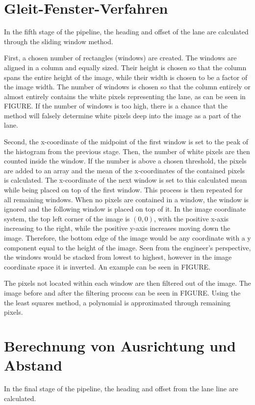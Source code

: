 \documentclass[arbeit=studie,oneside,BCOR=12mm]{ArbeitRST}
\begin{document}
\section{Gleit-Fenster-Verfahren}
In the fifth stage of the pipeline, the heading and offset of the lane are
calculated through the sliding window method.

First, a chosen number of rectangles (windows) are created. The windows are
aligned in a column and equally sized. Their height is chosen so that the
column spans the entire height of the image, while their width is chosen to be
a factor of the image width. The number of windows is chosen so that the column
entirely or almost entirely  contains the white pixels representing the lane,
as can be seen in FIGURE. If the number of windows is too high, there is a
chance that the method will falsely determine white pixels deep into the image
as a part of the lane. 

Second, the x-coordinate of the midpoint of the first window is set to the peak
of the histogram from the previous stage. Then, the number of white pixels are
then counted inside the window. If the number is above a chosen threshold, the
pixels are added to an array and the mean of the x-coordinates of the contained
pixels is calculated. The x-coordinate of the next window is set to this
calculated mean while being placed on top of the first window. This process is
then repeated for all remaining windows. When no pixels are contained in a
window, the window is ignored and the following window is placed on top of it.
In the image coordinate system, the top left corner of the image is $(0, 0)$,
with the positive x-axis increasing to the right, while the positive y-axis
increases moving down the image. Therefore, the bottom edge of the image would
be any coordinate with a y component equal to the height of the image. Seen
from the engineer's perspective, the windows would be stacked from lowest to
highest, however in the image coordinate space it is inverted. An example can
be seen in FIGURE.

The pixels not located within each window are then filtered out of the image.
The image before and after the filtering process can be seen in FIGURE. Using
the the least squares method, a polynomial is approximated through remaining
pixels.

\section{Berechnung von Ausrichtung und Abstand}
In the final stage of the pipeline, the heading and offset from the lane line
are calculated. 
\end{document}
